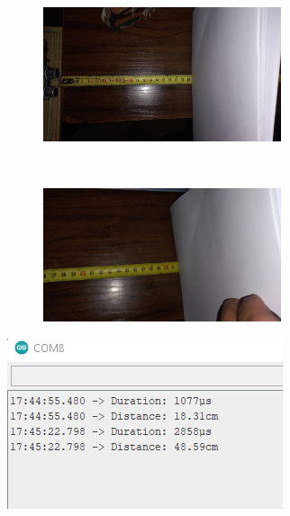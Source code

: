\begin{figure}
    \centering
    \begin{subfigure}[b]{.4\linewidth}
        \begin{subfigure}{\textwidth}
            \includegraphics[width=\textwidth]{assets/HC-SR04/essais/19cm.jpg}
        \end{subfigure}
        \\[8pt]
        \begin{subfigure}{\textwidth}
            \includegraphics[width=\textwidth]{assets/HC-SR04/essais/52cm.jpg}
        \end{subfigure}
    \end{subfigure}
    \hfill
    \begin{subfigure}[b]{.59\linewidth}
            \includegraphics[width=\textwidth]{assets/HC-SR04/essais/resultat.png}

\end{subfigure}
\end{figure}
